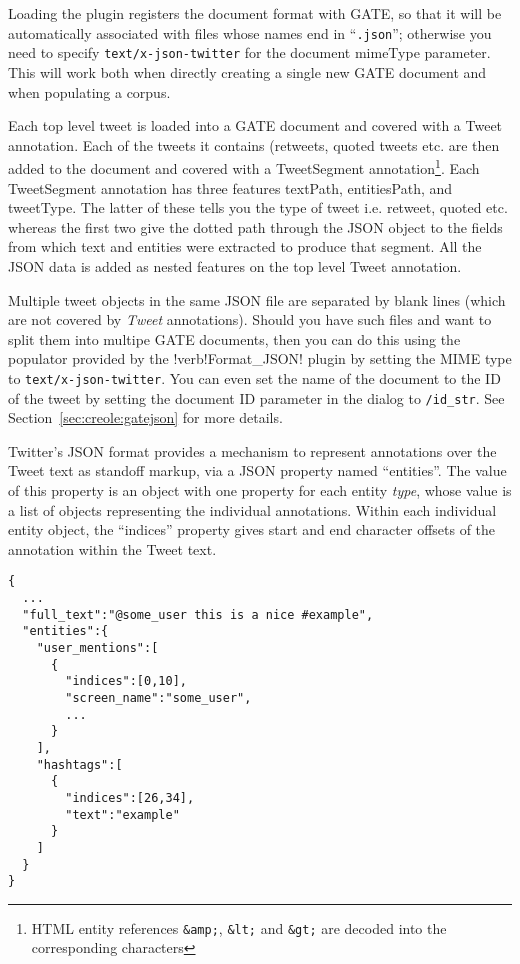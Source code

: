 Loading the plugin registers the
document format with GATE, so that it will be automatically associated with
files whose names end in ``\verb!.json!''; otherwise you need to specify
\verb!text/x-json-twitter! for the document mimeType parameter.  This will work
both when directly creating a single new GATE document and when populating a
corpus.

Each top level tweet is loaded into a GATE document and covered with a Tweet annotation.
Each of the tweets it contains (retweets, quoted tweets etc. are then added to the document
and covered with a TweetSegment annotation\footnote{HTML entity references \texttt{\&amp;}, \texttt{\&lt;} and
\texttt{\&gt;} are decoded into the corresponding characters}. Each TweetSegment annotation has three features
textPath, entitiesPath, and tweetType. The latter of these tells you the type of tweet i.e.
retweet, quoted etc. whereas the first two give the dotted path through the JSON object
to the fields from which text and entities were extracted to produce that segment.
All the JSON data is added as nested features on the top level Tweet annotation.

Multiple tweet objects in the same JSON file are separated by blank lines (which
are not covered by \emph{Tweet} annotations). Should you have such files and
want to split them into multipe GATE documents, then you can do this using the
populator provided by the !verb!Format\_JSON! plugin by setting the MIME type
to \verb!text/x-json-twitter!. You can even set the name of the document to the
ID of the tweet by setting the document ID parameter in the dialog to \verb!/id_str!.
See Section~\ref{sec:creole:gatejson} for more details.


Twitter's JSON format provides a mechanism to represent annotations over the
Tweet text as standoff markup, via a JSON property named ``entities''.  The
value of this property is an object with one property for each entity
\emph{type}, whose value is a list of objects representing the individual
annotations.  Within each individual entity object, the ``indices'' property
gives start and end character offsets of the annotation within the Tweet text.

\begin{verbatim}
{
  ...
  "full_text":"@some_user this is a nice #example",
  "entities":{
    "user_mentions":[
      {
        "indices":[0,10],
        "screen_name":"some_user",
        ...
      }
    ],
    "hashtags":[
      {
        "indices":[26,34],
        "text":"example"
      }
    ]
  }
}
\end{verbatim}

